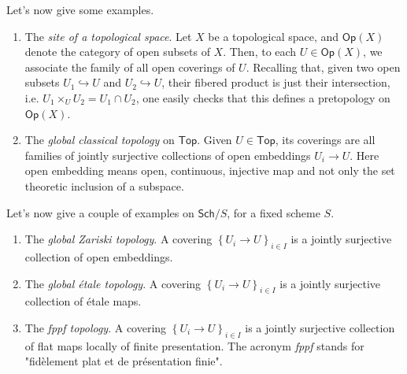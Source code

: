 \noindent
Let's now give some examples.
\begin{ex}\leavevmode\vspace{-.2\baselineskip}
\begin{enumerate}
	\item The \emph{site of a topological space}.
		Let $X$ be a topological space, and $\mathsf{Op}(X)$ denote the category of
		open subsets of $X$.
		Then, to each $U \in \mathsf{Op}(X)$, we associate the family of all
		open coverings of $U$.
		Recalling that, given two open subsets
		$U_1 \hookrightarrow  U$ and $U_2 \hookrightarrow  U$, 
		their fibered product is just their intersection, i.e. 
		$U_1 \times_{ U } U_2 = U_1 \cap U_2$,
		one easily checks that this defines a pretopology on $\mathsf{Op}(X)$.


	\item The \emph{global classical topology} on $\mathsf{Top}$.
		Given $U \in \mathsf{Top}$, its coverings are all families of jointly surjective
		collections of open embeddings $U_i \to U$.
		Here open embedding means open, continuous, injective map and not
		only the set theoretic inclusion of a subspace.



\end{enumerate}
Let's now give a couple of examples on $\mathsf{Sch}/S$, for a fixed scheme $S$.
\begin{enumerate}[resume]
	\item The \emph{global Zariski topology}.
		A covering $\left\{ U_{ i } \to U \right\}_{ i \in I }$ is a 
		jointly surjective collection of 
		open embeddings.
		

	\item The \emph{global étale topology}.
		A covering $\left\{ U_{ i } \to U \right\}_{ i \in I }$ is a 
		jointly surjective collection of 
		étale maps.

	\item The \emph{fppf topology}.
		A covering $\left\{ U_{ i } \to U \right\}_{ i \in I }$ is a 
		jointly surjective collection of 
		flat maps locally of finite presentation.
		The acronym \emph{fppf} stands for 
		"fidèlement plat et de présentation finie".
\end{enumerate}
\end{ex}

